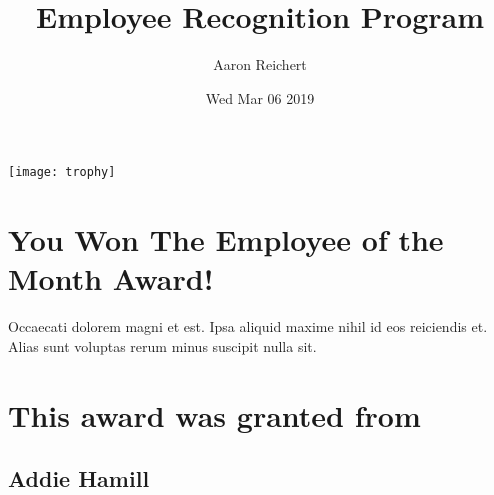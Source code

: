 \documentclass[12pt, letterpaper]{article}
\title{Employee Recognition Program}
\author{Aaron Reichert}
\date{Wed Mar 06 2019}
\begin{document}
\maketitle
\begin{center}
\texttt{[image: trophy]}
\section*{You Won The Employee of the Month Award!}
Occaecati dolorem magni et est. Ipsa aliquid maxime nihil id eos reiciendis et. Alias sunt voluptas rerum minus suscipit nulla sit.
\section*{This award was granted from}
\subsection*{Addie Hamill}
\end{center}
\end{document}
